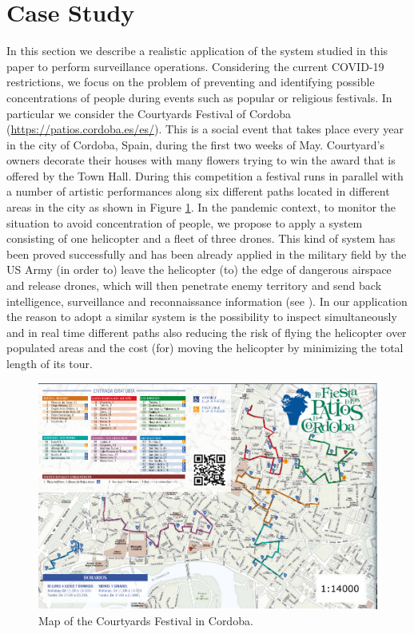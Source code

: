 \section{Case Study\label{section:CS}}

\noindent
In this section\CV{,} we describe a realistic application of the system studied in this paper to perform surveillance operations. Considering the current COVID-19 restrictions, we focus on the problem of preventing and identifying possible concentrations of people during events such as popular or religious festivals. In particular\CV{,} we consider the Courtyards Festival of Cordoba (\url{https://patios.cordoba.es/es/}). This is a social event that takes place every year in the city of Cordoba, Spain, during the first two weeks of May. Courtyard’s owners decorate their houses with many flowers trying to win the award that is offered by the Town Hall. During this competition\CV{,} a festival runs in parallel with a number of artistic performances along six different paths located in different areas in the city as shown in Figure \ref{fig:mapPF}.
In the pandemic context, to monitor the situation to avoid  concentration of people, we propose to apply a system consisting of one helicopter and a fleet of three drones.
This kind of system has been proved successfully and has been already applied in the military field by the US Army (in order to)  leave the helicopter (to)  the edge of dangerous airspace and release drones, which will then penetrate  enemy territory and send back intelligence, surveillance and reconnaissance information (see \cite{FG}).
In our application\CV{,} the reason to adopt a similar system is the possibility to inspect simultaneously and in real time different paths\CV{,} also reducing the risk of flying the helicopter over populated areas and the cost (for)  moving the helicopter by minimizing the total length of its tour.

\begin{figure}[h!]
\centering
\includegraphics[width=0.6\linewidth]{figures/first.png}
\caption{Map of the Courtyards Festival in Cordoba. \label{fig:mapPF}}
\end{figure}

